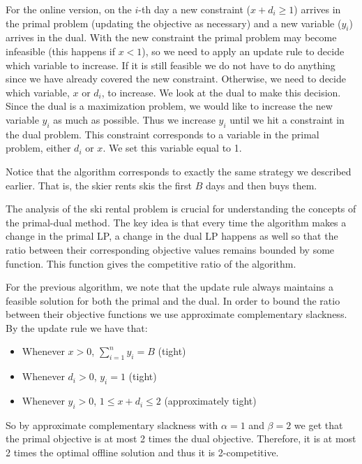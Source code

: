 For the online version, on the $i$-th day a new constraint ($x + d_i  \ge 1$) arrives in the primal problem (updating the objective as necessary) and a new variable ($y_i$) arrives in the dual.
With the new constraint the primal problem may become infeasible (this happens if $x < 1$), so we need to apply an update rule to decide which variable to increase.
If it is still feasible we do not have to do anything since we have already covered the new constraint. 
Otherwise, we need to decide which variable, $x$ or $d_i$, to increase. 
We look at the dual to make this decision. 
Since the dual is a maximization problem, we would like to increase the new variable $y_i$ as much as possible.
Thus we increase $y_i$ until we hit a constraint in the dual problem.
This constraint corresponds to a variable in the primal problem, either $d_i$ or $x$.
We set this variable equal to 1.

Notice that the algorithm corresponds to exactly the same strategy we described earlier. That is, the skier rents skis the first $B$ days and then buys them.


The analysis of the ski rental problem is crucial for understanding the concepts of the primal-dual method. 
The key idea is that every time the algorithm makes a change in the primal LP, a change in the dual LP happens as well so that the ratio between their corresponding objective values remains bounded by some function. 
This function gives the competitive ratio of the algorithm.

For the previous algorithm, we note that the update rule always maintains a feasible solution for both the primal and the dual. 
In order to bound the ratio between their objective functions we use approximate complementary slackness. 
By the update rule we have that:
\begin{itemize}
\item Whenever $x > 0$, $\sum^n_{i=1} y_i = B$ (tight)
\item Whenever $d_i > 0$, $y_i = 1$ (tight)
\item Whenever $y_i > 0$, $1 \le x+d_i \le 2$ (approximately tight)
\end{itemize}

So by approximate complementary slackness with $\alpha = 1$ and $\beta = 2$ we get that the primal objective is at most 2 times the dual objective. Therefore, it is at most 2 times the optimal offline solution and thus it is 2-competitive.

